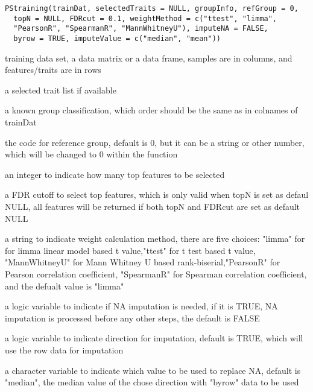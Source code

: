 \documentclass[letterpaper]{book}
\begin{document}
%
\begin{Usage}
\begin{verbatim}
PStraining(trainDat, selectedTraits = NULL, groupInfo, refGroup = 0,
  topN = NULL, FDRcut = 0.1, weightMethod = c("ttest", "limma",
  "PearsonR", "SpearmanR", "MannWhitneyU"), imputeNA = FALSE,
  byrow = TRUE, imputeValue = c("median", "mean"))
\end{verbatim}
\end{Usage}
%
\begin{Arguments}
\begin{ldescription}
\item[\code{trainDat}] training data set, a data matrix or a data frame, samples are in columns, and features/traits are in rows

\item[\code{selectedTraits}] a selected trait list if available

\item[\code{groupInfo}] a known group classification, which order should be the same as in colnames of trainDat

\item[\code{refGroup}] the code for reference group, default is 0, but it can be a string or other number, which will be 
changed to 0 within the function

\item[\code{topN}] an integer to indicate how many top features to be selected

\item[\code{FDRcut}] a FDR cutoff to select top features, which is only valid when topN is set as defaul NULL, 
all features will be returned if both topN and FDRcut are set as default NULL

\item[\code{weightMethod}] a string to indicate weight calculation method, there are five choices: 
"limma" for for limma linear model based t value,"ttest" for t test based t value, 
"MannWhitneyU" for Mann Whitney U based rank-biserial,"PearsonR" for Pearson correlation coefficient,
"SpearmanR" for Spearman correlation coefficient, and the defualt value is "limma"

\item[\code{imputeNA}] a logic variable to indicate if NA imputation is needed, if it is TRUE, 
NA imputation is processed before any other steps, the default is FALSE

\item[\code{byrow}] a logic variable to indicate direction for imputation, default is TRUE, 
which will use the row data for imputation

\item[\code{imputeValue}] a character variable to indicate which value to be used to replace NA, default is "median", 
the median value of the chose direction with "byrow" data to be used
\end{ldescription}
\end{Arguments}
\end{document}
